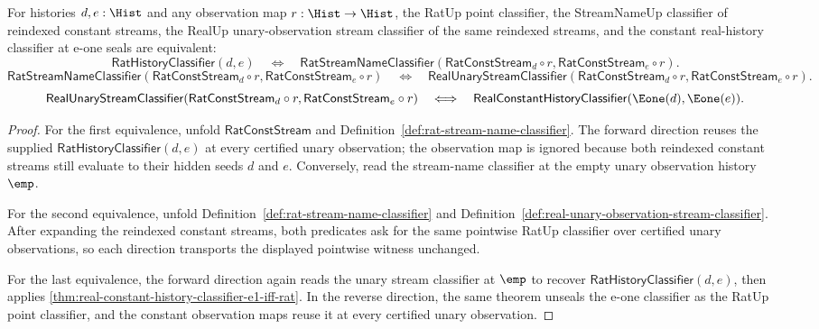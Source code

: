 \begin{theorem}
\label{thm:real-constant-reindexed-stream-bridge}
For histories $d,e:\Hist$ and any observation map $r:\Hist\to\Hist$, the
RatUp point classifier, the StreamNameUp classifier of reindexed constant
streams, the RealUp unary-observation stream classifier of the same reindexed
streams, and the constant real-history classifier at e-one seals are
equivalent:
$$
\mathsf{RatHistoryClassifier}(d,e)
\quad\Longleftrightarrow\quad
\mathsf{RatStreamNameClassifier}(\mathsf{RatConstStream}_d\circ r,
\mathsf{RatConstStream}_e\circ r).
$$
$$
\mathsf{RatStreamNameClassifier}(\mathsf{RatConstStream}_d\circ r,
\mathsf{RatConstStream}_e\circ r)
\quad\Longleftrightarrow\quad
\mathsf{RealUnaryStreamClassifier}(\mathsf{RatConstStream}_d\circ r,
\mathsf{RatConstStream}_e\circ r).
$$
$$
\mathsf{RealUnaryStreamClassifier}(\mathsf{RatConstStream}_d\circ r,
\mathsf{RatConstStream}_e\circ r)
\quad\Longleftrightarrow\quad
\mathsf{RealConstantHistoryClassifier}(\Eone(d),\Eone(e)).
$$
\end{theorem}
\begin{proof}
For the first equivalence, unfold $\mathsf{RatConstStream}$ and
Definition~\ref{def:rat-stream-name-classifier}. The forward direction reuses
the supplied $\mathsf{RatHistoryClassifier}(d,e)$ at every certified unary
observation; the observation map is ignored because both reindexed constant
streams still evaluate to their hidden seeds $d$ and $e$. Conversely, read the
stream-name classifier at the empty unary observation history $\emp$.

For the second equivalence, unfold
Definition~\ref{def:rat-stream-name-classifier} and
Definition~\ref{def:real-unary-observation-stream-classifier}. After expanding
the reindexed constant streams, both predicates ask for the same pointwise
RatUp classifier over certified unary observations, so each direction transports
the displayed pointwise witness unchanged.

For the last equivalence, the forward direction again reads the unary stream
classifier at $\emp$ to recover $\mathsf{RatHistoryClassifier}(d,e)$, then
applies \autoref{thm:real-constant-history-classifier-e1-iff-rat}. In the
reverse direction, the same theorem unseals the e-one classifier as the RatUp
point classifier, and the constant observation maps reuse it at every certified
unary observation.
\end{proof}

